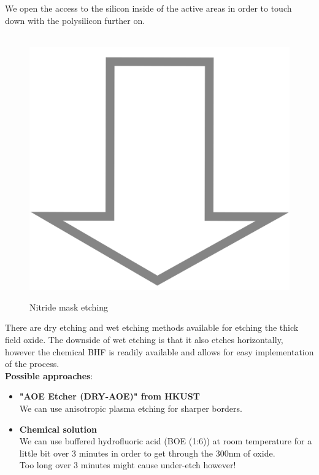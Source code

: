 We open the access to the silicon inside of the active areas in order to touch down with the polysilicon further on.

\begin{figure}[H]
	\centering
	\begin{tikzpicture}[node distance = 3cm, auto, thick,scale=\CrossSectionOnly, every node/.style={transform shape}]
		
	\end{tikzpicture} \\
	\includegraphics[scale=0.01]{down_arrow.png} \\
	\begin{tikzpicture}[node distance = 3cm, auto, thick,scale=\CrossSectionOnly, every node/.style={transform shape}]
		
	\end{tikzpicture}
	\caption{Nitride mask etching}
\end{figure}

There are dry etching and wet etching methods available for etching the thick field oxide.
The downside of wet etching is that it also etches horizontally, however the chemical BHF is readily available and allows for easy implementation of the process.\\

\textbf{Possible approaches}:
\begin{itemize}
	\item \textbf{"AOE Etcher (DRY-AOE)" from HKUST} \\
	We can use anisotropic plasma etching for sharper borders.
	\item \textbf{Chemical solution} \\
	We can use buffered hydrofluoric acid (BOE (1:6)) at room temperature for a little bit over 3 minutes in order to get through the 300nm of oxide.\\
	Too long over 3 minutes might cause under-etch however!
\end{itemize}

